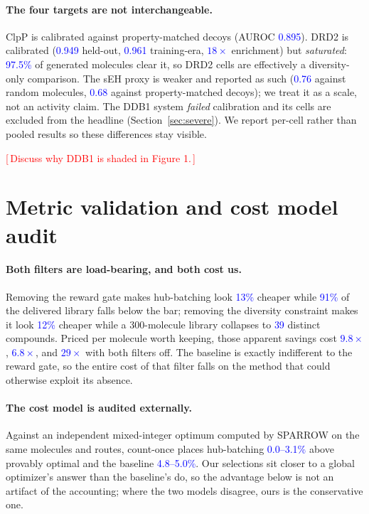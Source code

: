 \documentclass{article}
\newcommand{\pending}[1]{\textcolor{red}{[\,#1\,]}}
\newcommand{\checkval}[1]{\textcolor{blue}{#1}}
\begin{document}
\paragraph{The four targets are not interchangeable.} ClpP is calibrated against property-matched decoys (AUROC \checkval{0.895}). DRD2 is calibrated (\checkval{0.949} held-out, \checkval{0.961} training-era, \checkval{$18\times$} enrichment) but \emph{saturated}: \checkval{97.5\%} of generated molecules clear it, so DRD2 cells are effectively a diversity-only comparison. The sEH proxy is weaker and reported as such (\checkval{0.76} against random molecules, \checkval{0.68} against property-matched decoys); we treat it as a scale, not an activity claim. The DDB1 system \emph{failed} calibration and its cells are excluded from the headline (Section~\ref{sec:severe}). We report per-cell rather than pooled results so these differences stay visible.

\pending{Discuss why DDB1 is shaded in Figure 1.}


\section{Metric validation and cost model audit}
\label{app:fair}
\paragraph{Both filters are load-bearing, and both cost us.}
Removing the reward gate makes hub-batching look \checkval{13\%} cheaper while \checkval{91\%} of the delivered library falls below the bar; removing the diversity constraint makes it look \checkval{12\%} cheaper while a 300-molecule library collapses to \checkval{39} distinct compounds. Priced per molecule worth keeping, those apparent savings cost \checkval{$9.8\times$}, \checkval{$6.8\times$}, and \checkval{$29\times$} with both filters off. The baseline is exactly indifferent to the reward gate, so the entire cost of that filter falls on the method that could otherwise exploit its absence.

\paragraph{The cost model is audited externally.}
Against an independent mixed-integer optimum computed by SPARROW \citep{fromer2024sparrow} on the same molecules and routes, count-once places
hub-batching \checkval{0.0--3.1\%} above provably optimal and the baseline
\checkval{4.8--5.0\%}. Our selections sit closer to a global optimizer's answer than the baseline's do, so the advantage below is not an artifact of the accounting; where the two models disagree, ours is the conservative one.
\end{document}
